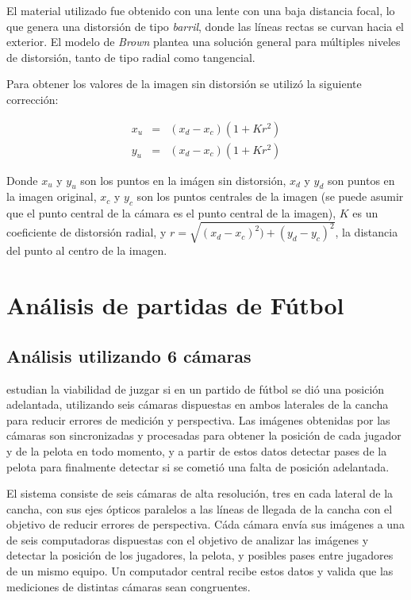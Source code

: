 \documentclass[a4paper,10pt]{article}
\begin{document}
El material utilizado fue obtenido con una lente con una baja distancia focal,
lo que genera una distorsión de tipo \textit{barril}, donde las líneas rectas
se curvan hacia el exterior. El modelo de \textit{Brown} plantea una solución
general para múltiples niveles de distorsión, tanto de tipo radial como
tangencial.

Para obtener los valores de la imagen sin distorsión se utilizó la siguiente
corrección:

\begin{eqnarray*}
    x_u &=& (x_d - x_c) (1+K r^2) \\
    y_u &=& (x_d - x_c) (1+K r^2)
\end{eqnarray*}

Donde $x_u$ y $y_u$ son los puntos en la imágen sin distorsión, $x_d$ y $y_d$ son
puntos en la imagen original, $x_c$ y $y_c$ son los puntos centrales de la
imagen (se puede asumir que el punto central de la cámara es el punto central
de la imagen), $K$ es un coeficiente de distorsión radial, y $r =
\sqrt{(x_d-x_c)^2) + (y_d-y_c)^2}$, la distancia del punto al centro de la
imagen.


\section{Análisis de partidas de Fútbol}
\label{sec:futbol}

\subsection{Análisis utilizando 6 cámaras}
\label{sec:6-camaras}

\citeauthor*{papers-tanos} estudian la viabilidad de juzgar si en un partido de fútbol
se dió una posición adelantada, utilizando seis cámaras dispuestas en ambos
laterales de la cancha para reducir errores de medición y perspectiva. Las
imágenes obtenidas por las cámaras son sincronizadas y procesadas para obtener
la posición de cada jugador y de la pelota en todo momento, y a partir de estos
datos detectar pases de la pelota para finalmente detectar si se cometió una
falta de posición adelantada.

El sistema consiste de seis cámaras de alta resolución, tres en cada lateral de
la cancha, con sus ejes ópticos paralelos a las líneas de llegada de la cancha
con el objetivo de reducir errores de perspectiva. Cáda cámara envía sus
imágenes a una de seis computadoras dispuestas con el objetivo de analizar las
imágenes y detectar la posición de los jugadores, la pelota, y posibles pases
entre jugadores de un mismo equipo. Un computador central recibe estos datos y
valida que las mediciones de distintas cámaras sean congruentes.
\end{document}
